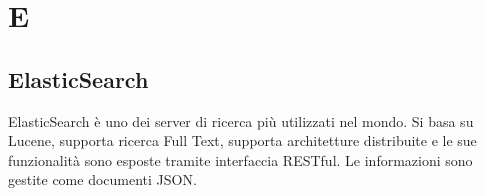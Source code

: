 \section{E}
	
    \subsection*{ElasticSearch}

        ElasticSearch è uno dei server di ricerca più utilizzati nel mondo.
        Si basa su Lucene, supporta ricerca Full Text, supporta architetture distribuite e le sue funzionalità sono
        esposte tramite interfaccia RESTful.
        Le informazioni sono gestite come documenti JSON.